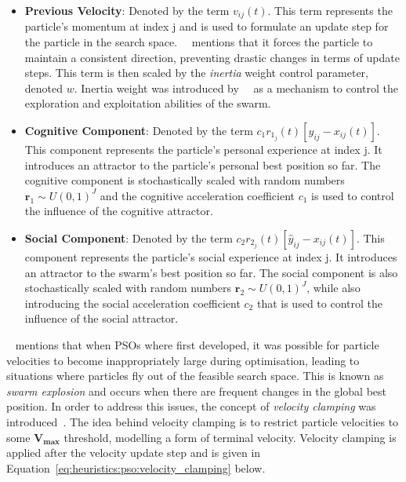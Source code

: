 \begin{itemize}
      \item \textbf{Previous Velocity}: Denoted by the term $v_{ij}(t)$. This term represents the particle's momentum at index j and is used to formulate an update step for the particle in the search space.~\citeauthor{ref:vanwyk:2014}~\cite{ref:vanwyk:2014} mentions that it forces the particle to maintain a consistent direction, preventing drastic changes in terms of update steps. This term is then scaled by the \textit{inertia} weight control parameter, denoted $w$. Inertia weight was introduced by~\citeauthor{ref:shi:1998}~\cite{ref:shi:1998} as a mechanism to control the exploration and exploitation abilities of the swarm.

      \item \textbf{Cognitive Component}: Denoted by the term $c_{1}r_{1_{j}}(t)[y_{ij} - x_{ij}(t)]$. This component represents the particle's personal experience at index j. It introduces an attractor to the particle's personal best position so far. The cognitive component is stochastically scaled with random numbers $\boldsymbol{r}_{1} \sim U(0,1)^J$ and the cognitive acceleration coefficient $c_{1}$ is used to control the influence of the cognitive attractor.

      \item \textbf{Social Component}: Denoted by the term $c_{2}r_{2_{j}}(t)[\hat{y}_{ij} - x_{ij}(t)]$. This component represents the particle's social experience at index j. It introduces an attractor to the swarm's best position so far. The social component is also stochastically scaled with random numbers $\boldsymbol{r}_{2} \sim U(0,1)^J$, while also introducing the social acceleration coefficient $c_{2}$ that is used to control the influence of the social attractor.
\end{itemize}

\citeauthor{ref:vanwyk:2014}~\cite{ref:vanwyk:2014} mentions that when \acp{PSO} where first developed, it was possible for particle velocities to become inappropriately large during optimisation, leading to situations where particles fly out of the feasible search space. This is known as \textit{swarm explosion} and occurs when there are frequent changes in the global best position. In order to address this issues, the concept of \textit{velocity clamping} was introduced~\cite{ref:eberhart:1996}. The idea behind velocity clamping is to restrict particle velocities to some $\boldsymbol{V_{max}}$ threshold, modelling a form of terminal velocity. Velocity clamping is applied after the velocity update step and is given in Equation~\eqref{eq:heuristics:pso:velocity_clamping} below.

